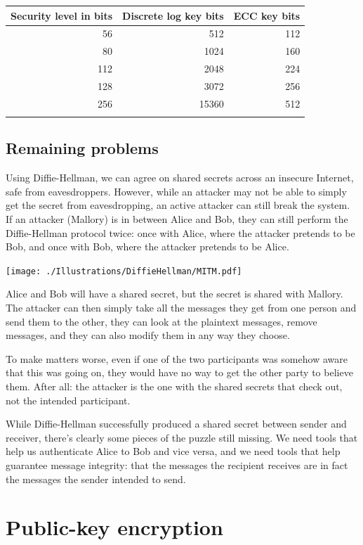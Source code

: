 \documentclass[11pt,ebook,table,dvipsnames]{memoir}
\begin{document}
\begin{center}
\begin{tabular}{rrr}
Security level in bits & Discrete log key bits & ECC key bits\\
\hline
56 & 512 & 112\\
80 & 1024 & 160\\
112 & 2048 & 224\\
128 & 3072 & 256\\
256 & 15360 & 512\\
 &  & \\
\end{tabular}
\end{center}
\section{Remaining problems}
\label{sec-2-4-5}

Using Diffie-Hellman, we can agree on shared secrets across an
insecure Internet, safe from eavesdroppers. However, while an attacker
may not be able to simply get the secret from eavesdropping, an active
attacker can still break the system. If an attacker (Mallory) is in
between Alice and Bob, they can still perform the Diffie-Hellman
protocol twice: once with Alice, where the attacker pretends to be
Bob, and once with Bob, where the attacker pretends to be Alice.

\texttt{[image: ./Illustrations/DiffieHellman/MITM.pdf]}

Alice and Bob will have a shared secret, but the secret is shared with
Mallory. The attacker can then simply take all the messages they get
from one person and send them to the other, they can look at the
plaintext messages, remove messages, and they can also modify them in
any way they choose.

To make matters worse, even if one of the two participants was somehow
aware that this was going on, they would have no way to get the other
party to believe them. After all: the attacker is the one with the
shared secrets that check out, not the intended participant.

While Diffie-Hellman successfully produced a shared secret between
sender and receiver, there's clearly some pieces of the puzzle still
missing. We need tools that help us authenticate Alice to Bob and vice
versa, and we need tools that help guarantee message integrity: that
the messages the recipient receives are in fact the messages the
sender intended to send.
\chapter{Public-key encryption}
\label{sec-2-5}
\end{document}
